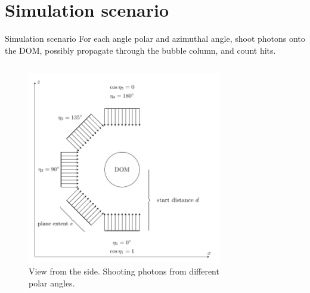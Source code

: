 \section{Simulation scenario}
\begin{frame}[fragile]{Simulation scenario}
  For each angle polar and azimuthal angle, shoot photons onto the DOM, possibly propagate through the bubble column, and count hits.

  \begin{columns}
    \begin{column}{0.5\textwidth}
      \begin{figure}
        \includegraphics[width=0.9\textwidth]{img/angular-acceptance-coordinates-plane-waves-Ii2nieki}
        \caption{View from the side. Shooting photons from different polar angles.}
      \end{figure}
    \end{column}
    \begin{column}{0.5\textwidth}
      \begin{figure}

\end{figure}
\end{column}
\end{columns}
\end{frame}
